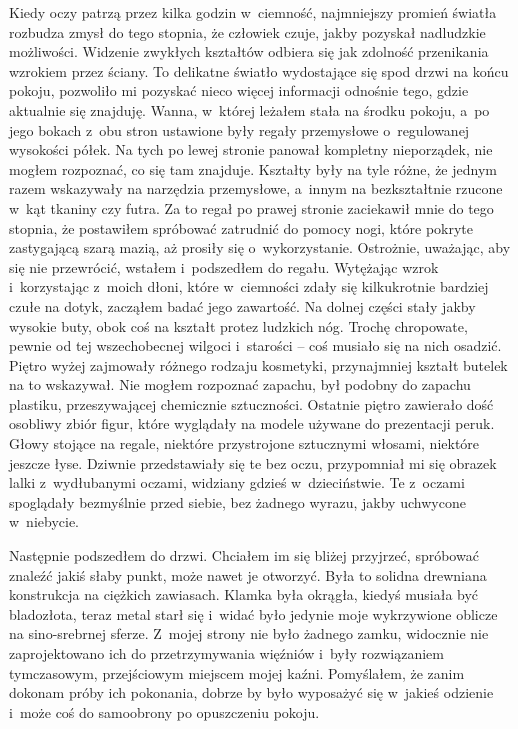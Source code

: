 Kiedy oczy patrzą przez kilka godzin w~ciemność, najmniejszy promień światła rozbudza zmysł do tego stopnia, że 
człowiek czuje, jakby pozyskał nadludzkie możliwości. Widzenie zwykłych kształtów odbiera się jak zdolność 
przenikania wzrokiem przez ściany. To delikatne światło wydostające się spod drzwi na końcu pokoju, pozwoliło mi 
pozyskać nieco więcej informacji odnośnie tego, gdzie aktualnie się znajduję. Wanna, w~której leżałem stała na środku 
pokoju, a~po jego bokach z~obu stron ustawione były regały przemysłowe o~regulowanej wysokości półek. Na tych po 
lewej stronie panował kompletny nieporządek, nie mogłem rozpoznać, co się tam znajduje. Kształty były na tyle różne, 
że jednym razem wskazywały na narzędzia przemysłowe, a~innym na bezkształtnie rzucone w~kąt tkaniny czy futra. Za to 
regał po prawej stronie zaciekawił mnie do tego stopnia, że postawiłem spróbować zatrudnić do pomocy nogi, które 
pokryte zastygającą szarą mazią, aż prosiły się o~wykorzystanie. Ostrożnie, uważając, aby się nie przewrócić, wstałem 
i~podszedłem do regału. Wytężając wzrok i~korzystając z~moich dłoni, które w~ciemności zdały się kilkukrotnie 
bardziej czułe na dotyk, zacząłem badać jego zawartość. Na dolnej części stały jakby wysokie buty, obok coś na 
kształt protez ludzkich nóg. Trochę chropowate, pewnie od tej wszechobecnej wilgoci i~starości -- coś musiało się na 
nich osadzić. Piętro wyżej zajmowały różnego rodzaju kosmetyki, przynajmniej kształt butelek na to wskazywał. Nie 
mogłem rozpoznać zapachu, był podobny do zapachu plastiku, przeszywającej chemicznie sztuczności. Ostatnie piętro 
zawierało dość osobliwy zbiór figur, które wyglądały na modele używane do prezentacji peruk. Głowy stojące na regale, 
niektóre przystrojone sztucznymi włosami, niektóre jeszcze łyse. Dziwnie przedstawiały się te bez oczu, przypomniał 
mi się obrazek lalki z~wydłubanymi oczami, widziany gdzieś w~dzieciństwie. Te z~oczami spoglądały bezmyślnie przed 
siebie, bez żadnego wyrazu, jakby uchwycone w~niebycie. 

Następnie podszedłem do drzwi. Chciałem im się bliżej przyjrzeć, spróbować znaleźć jakiś słaby punkt, może nawet je 
otworzyć. Była to solidna drewniana konstrukcja na ciężkich zawiasach. Klamka była okrągła, kiedyś musiała być 
bladozłota, teraz metal starł się i~widać było jedynie moje wykrzywione oblicze na sino-srebrnej sferze. Z~mojej 
strony nie było żadnego zamku, widocznie nie zaprojektowano ich do przetrzymywania więźniów i~były rozwiązaniem 
tymczasowym, przejściowym miejscem mojej kaźni. Pomyślałem, że zanim dokonam próby ich pokonania, dobrze by było 
wyposażyć się w~jakieś odzienie i~może coś do samoobrony po opuszczeniu pokoju.

